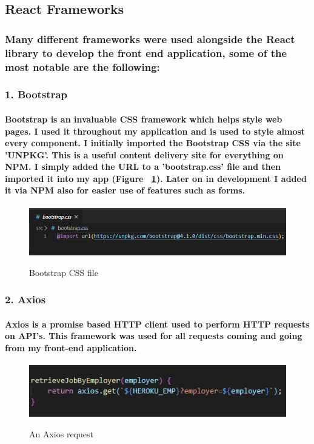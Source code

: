 \subsection{React Frameworks}
\subsubsection{Many different frameworks were used alongside the React library to develop the front end application, some of the most notable are the following:}

\subsubsection{1. Bootstrap}
\paragraph{Bootstrap is an invaluable CSS framework which helps style web pages. I used it throughout my application and is used to style almost every component. I initially imported the Bootstrap CSS via the site 'UNPKG'. This is a useful content delivery site for everything on NPM. I simply added the URL to a 'bootstrap.css' file and then imported it into my app (Figure ~\ref{boot_label}). Later on in development I added it via NPM also for easier use of features such as forms.}
\begin{figure}[h]
    \centering
    \includegraphics[scale=0.4]{Images/bootstrap1.png} 
    \label{boot_label}
    \caption{Bootstrap CSS file}
\end{figure}

\subsubsection{2. Axios}
\paragraph{Axios is a promise based HTTP client used to perform HTTP requests on API's. This framework was used for all requests coming and going from my front-end application.}
\begin{figure}[h]
    \centering
    \includegraphics[scale=0.5]{Images/axios.png} 
    \label{axios_label}
    \caption{An Axios request}
\end{figure}

